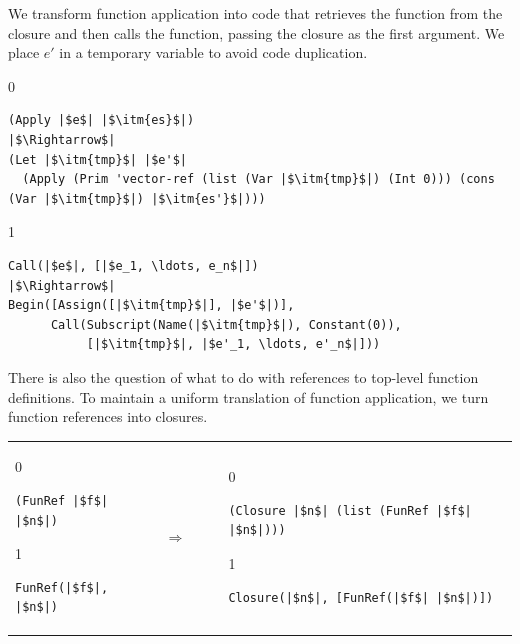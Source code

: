 \documentclass[7x10]{TimesAPriori_MIT}%
\def\racketEd{0}
\def\pythonEd{1}
\providecommand{\BookEdition}{1}
\let\edition\BookEdition
\newcommand{\pythonColor}[0]{}
\numberwithin{theorem}{chapter}
\numberwithin{definition}{chapter}
\numberwithin{equation}{chapter}
\begin{document}
We transform function application into code that retrieves the
function from the closure and then calls the function, passing the
closure as the first argument. We place $e'$ in a temporary variable
to avoid code duplication.
\begin{center}
\begin{minipage}{\textwidth}
{\if\edition\racketEd
\begin{lstlisting}
(Apply |$e$| |$\itm{es}$|)
|$\Rightarrow$|
(Let |$\itm{tmp}$| |$e'$|
  (Apply (Prim 'vector-ref (list (Var |$\itm{tmp}$|) (Int 0))) (cons (Var |$\itm{tmp}$|) |$\itm{es'}$|)))
\end{lstlisting}
\fi}
%
{\if\edition\pythonEd\pythonColor
\begin{lstlisting}
Call(|$e$|, [|$e_1, \ldots, e_n$|])
|$\Rightarrow$|
Begin([Assign([|$\itm{tmp}$|], |$e'$|)],
      Call(Subscript(Name(|$\itm{tmp}$|), Constant(0)),
           [|$\itm{tmp}$|, |$e'_1, \ldots, e'_n$|]))
\end{lstlisting}
\fi}
\end{minipage}
\end{center}

There is also the question of what to do with references to top-level
function definitions. To maintain a uniform translation of function
application, we turn function references into closures.

\begin{tabular}{lll}
\begin{minipage}{0.2\textwidth}
{\if\edition\racketEd
\begin{lstlisting}
(FunRef |$f$| |$n$|)
\end{lstlisting}
\fi}
{\if\edition\pythonEd\pythonColor
\begin{lstlisting}
FunRef(|$f$|, |$n$|)
\end{lstlisting}
\fi}
\end{minipage}
&
$\Rightarrow\qquad$
&
\begin{minipage}{0.5\textwidth}
{\if\edition\racketEd
\begin{lstlisting}
(Closure |$n$| (list (FunRef |$f$| |$n$|)))
\end{lstlisting}
\fi}
{\if\edition\pythonEd\pythonColor
\begin{lstlisting}
Closure(|$n$|, [FunRef(|$f$| |$n$|)])
\end{lstlisting}
\fi}
\end{minipage}
\end{tabular}  \\
\end{document}
